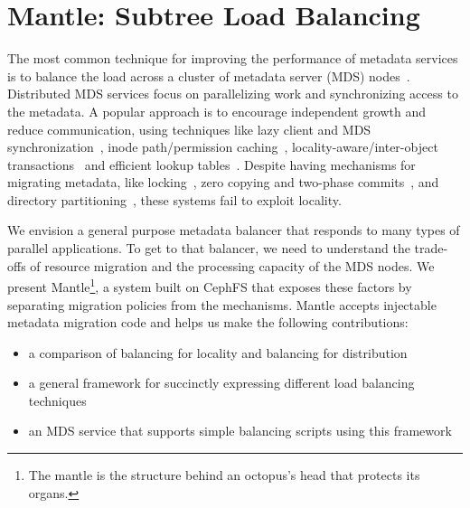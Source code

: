 \chapter{Mantle: Subtree Load Balancing}
\label{mantle}

The most common technique for improving the performance of metadata services is
to balance the load across a cluster of metadata server (MDS)
nodes~\cite{patil:fast2011-giga+, weil:osdi2006-ceph, weil:sc2004-dyn-metadata,
sinnamohideen:atc2010-ursa, xing:sc2009-skyfs}.  Distributed MDS services focus
on parallelizing work and synchronizing access to the metadata. A popular
approach is to encourage independent growth and reduce communication, using
techniques like lazy client and MDS synchronization~\cite{patil:fast2011-giga+,
ren:sc2014-indexfs, zheng:pdsw2014-batchfs, hildebrand:msst2005-pnfs,
zhu:pds2008-hba}, inode path/permission caching~\cite{brandt:mss2003-lh,
li:msst2006-dynamic, xing:sc2009-skyfs}, locality-aware/inter-object
transactions~\cite{sinnamohideen:atc2010-ursa,zhu:pds2008-hba,ren:atc2013-tablefs,
ren:sc2014-indexfs} and efficient lookup tables~\cite{brandt:mss2003-lh,
zhu:pds2008-hba}. Despite having mechanisms for migrating metadata, like
locking~\cite{sinnamohideen:atc2010-ursa,schmuck:fast2002-gpfs}, zero copying
and two-phase commits~\cite{sinnamohideen:atc2010-ursa}, and directory
partitioning~\cite{xing:sc2009-skyfs, patil:fast2011-giga+, ren:sc2014-indexfs,
weil:osdi2006-ceph}, these systems fail to exploit locality.

We envision a general purpose metadata balancer that responds to many types of
parallel applications. To get to that balancer, we need to understand the
trade-offs of resource migration and the processing capacity of the MDS nodes.
We present Mantle\footnote{The mantle is the structure behind an octopus's head
that protects its organs.}, a system built on CephFS that exposes these factors
by separating migration policies from the mechanisms. Mantle accepts injectable
metadata migration code and helps us make the following contributions:

\begin{itemize}

    \item a comparison of balancing for locality and balancing for distribution

    \item a general framework for succinctly expressing different load
    balancing techniques 

    \item an MDS service that supports simple balancing scripts using this
    framework

\end{itemize}

